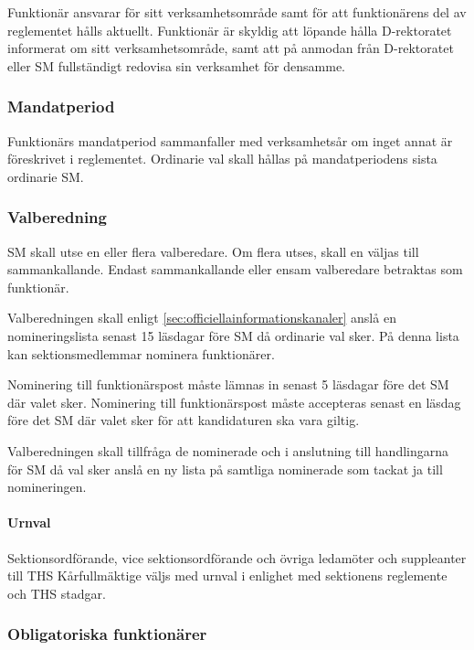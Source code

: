 \documentclass[a4paper,12pt]{article}
\begin{document}
Funktionär ansvarar för sitt verksamhetsområde samt för att funktionärens del av reglementet hålls aktuellt. Funktionär är skyldig att löpande hålla D-rektoratet informerat om sitt verksamhetsområde, samt att på anmodan från D-rektoratet eller SM fullständigt redovisa sin verksamhet för densamme.

\subsubsection{Mandatperiod}

Funktionärs mandatperiod sammanfaller med verksamhetsår om inget annat är föreskrivet i reglementet. Ordinarie val skall hållas på mandatperiodens sista ordinarie SM.

\subsubsection{Valberedning}

SM skall utse en eller flera valberedare. Om flera utses, skall en väljas till
sammankallande. Endast sammankallande eller ensam valberedare betraktas som funktionär.

Valberedningen skall enligt \ref{sec:officiellainformationskanaler} anslå en nomineringslista senast 15 läsdagar före SM då ordinarie val sker. På denna lista kan sektionsmedlemmar nominera funktionärer.

Nominering till funktionärspost måste lämnas in senast 5 läsdagar före det SM där valet sker. Nominering till funktionärspost måste accepteras senast en läsdag före det SM där valet sker för att kandidaturen ska vara giltig.

Valberedningen skall tillfråga de nominerade och i anslutning till handlingarna för SM då val sker anslå en ny lista på samtliga nominerade som tackat ja till nomineringen.

\paragraph{Urnval}

Sektionsordförande, vice sektionsordförande och övriga ledamöter och suppleanter till THS Kårfullmäktige väljs med urnval i enlighet med sektionens reglemente och THS stadgar.

\subsubsection{Obligatoriska funktionärer}
\end{document}
